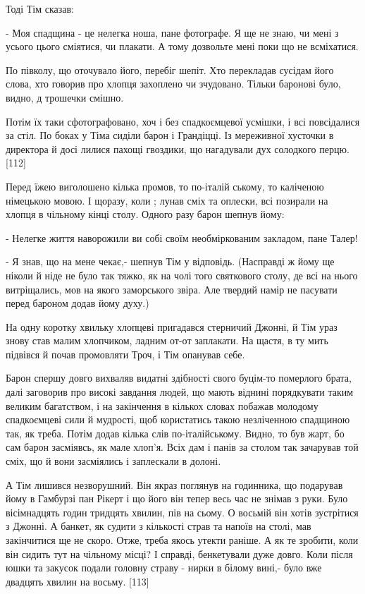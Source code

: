 Тоді Тім сказав:

- Моя спадщина - це нелегка ноша, пане фотографе. Я ще не знаю, чи мені з усього цього сміятися, чи плакати. А тому дозвольте мені поки що не всміхатися.

По півколу, що оточувало його, перебіг шепіт. Хто перекладав сусідам його слова, хто говорив про хлопця захоплено чи зчудовано. Тільки баронові було, видно, д трошечки смішно.

Потім їх таки сфотографовано, хоч і без спадкоємцевої усмішки, і всі повсідалися за стіл. По боках у Тіма сиділи барон і Грандіцці. Із мереживної хусточки в директора й досі лилися пахощі гвоздики, що нагадували дух солодкого перцю. [112]

Перед їжею виголошено кілька промов, то по-італій ському, то каліченою німецькою мовою. І щоразу, коли ; лунав сміх та оплески, всі позирали на хлопця в чільному кінці столу. Одного разу барон шепнув йому:

- Нелегке життя наворожили ви собі своїм необміркованим закладом, пане Талер!

- Я знав, що на мене чекає,- шепнув Тім у відповідь. (Насправді ж йому ще ніколи й ніде не було так тяжко, як на чолі того святкового столу, де всі на нього витріщались, мов на якого заморського звіра. Але твердий намір не пасувати перед бароном додав йому духу.)

На одну коротку хвильку хлопцеві пригадався стерничий Джонні, й Тім ураз знову став малим хлопчиком, ладним от-от заплакати. На щастя, в ту мить підвівся й почав промовляти Троч, і Тім опанував себе.

Барон спершу довго вихваляв видатні здібності свого буцім-то померлого брата, далі заговорив про високі завдання людей, що мають віднині порядкувати таким великим багатством, і на закінчення в кількох словах побажав молодому спадкоємцеві сили й мудрості, щоб користатись такою незліченною спадщиною так, як треба. Потім додав кілька слів по-італійському. Видно, то був жарт, бо сам барон засміявсь, як мале хлоп'я. Всіх дам і панів за столом так зачарував той сміх, що й вони засміялись і заплескали в долоні.

А Тім лишився незворушний. Він якраз поглянув на годинника, що подарував йому в Гамбурзі пан Рікерт і що його він тепер весь час не знімав з руки. Було вісімнадцять годин тридцять хвилин, пів на сьому. О восьмій він хотів зустрітися з Джонні. А банкет, як судити з кількості страв та напоїв на столі, мав закінчитися ще не скоро. Отже, треба якось утекти раніше. А як те зробити, коли він сидить тут на чільному місці? І справді, бенкетували дуже довго. Коли після юшки та закусок подали головну страву - нирки в білому вині,- було вже двадцять хвилин на восьму. [113]

